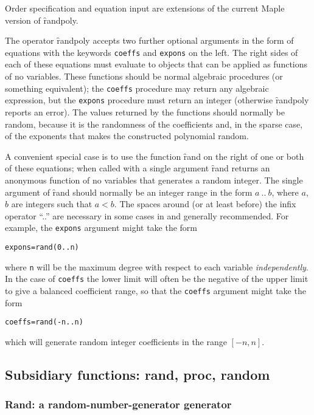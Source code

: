 Order specification and equation input are extensions of the current
Maple version of \f{randpoly}.

The operator \f{randpoly} accepts two further optional arguments in
the form of equations with the keywords \texttt{coeffs} and \texttt{expons}
on the left.  The right sides of each of these equations must evaluate
to objects that can be applied as functions of no variables.  These
functions should be normal algebraic procedures (or something
equivalent); the \texttt{coeffs} procedure may return any algebraic
expression, but the \texttt{expons} procedure must return an integer
(otherwise \f{randpoly} reports an error).  The values returned by
the functions should normally be random, because it is the randomness
of the coefficients and, in the sparse case, of the exponents that
makes the constructed polynomial random.

\hypertarget{operator:RAND}{}
A convenient special case is to use the function
\f{rand} on the
right of one or both of these equations; when called with a single
argument \f{rand} returns an anonymous function of no variables that
generates a random integer.  The single argument of \f{rand} should
normally be an integer range in the form $a~..~b$, where $a$, $b$ are
integers such that $a < b$.  The spaces around (or at least before)
the infix operator ``..'' are necessary in some cases in \REDUCE and
generally recommended.  For example, the \texttt{expons} argument might
take the form
\begin{alltt}
  expons = rand(0 .. n)
\end{alltt}
where \texttt{n} will be the maximum degree with respect to each variable
\emph{independently}.  In the case of \texttt{coeffs} the lower limit will
often be the negative of the upper limit to give a balanced
coefficient range, so that the \texttt{coeffs} argument might take the
form
\begin{alltt}
  coeffs = rand(-n .. n)
\end{alltt}
which will generate random integer coefficients in the range $[-n,n]$.


\subsection{Subsidiary functions: rand, proc, random}
\label{randpolysec:Subsidiary}

\subsubsection{Rand: a random-number-generator generator}

